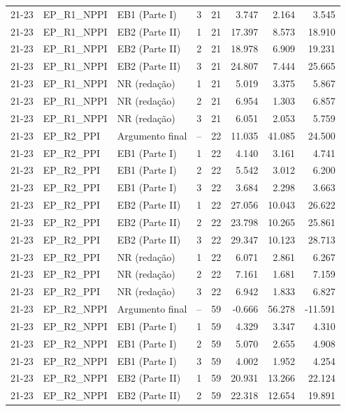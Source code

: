 \begin{longtable}{lllcrrrr}
21-23 & EP\_R1\_NPPI & EB1 (Parte I) & 3 & 21 & 3.747 & 2.164 & 3.545 \\
21-23 & EP\_R1\_NPPI & EB2 (Parte II) & 1 & 21 & 17.397 & 8.573 & 18.910 \\
21-23 & EP\_R1\_NPPI & EB2 (Parte II) & 2 & 21 & 18.978 & 6.909 & 19.231 \\
21-23 & EP\_R1\_NPPI & EB2 (Parte II) & 3 & 21 & 24.807 & 7.444 & 25.665 \\
21-23 & EP\_R1\_NPPI & NR (redação) & 1 & 21 & 5.019 & 3.375 & 5.867 \\
21-23 & EP\_R1\_NPPI & NR (redação) & 2 & 21 & 6.954 & 1.303 & 6.857 \\
21-23 & EP\_R1\_NPPI & NR (redação) & 3 & 21 & 6.051 & 2.053 & 5.759 \\
21-23 & EP\_R2\_PPI & Argumento final & -- & 22 & 11.035 & 41.085 & 24.500 \\
21-23 & EP\_R2\_PPI & EB1 (Parte I) & 1 & 22 & 4.140 & 3.161 & 4.741 \\
21-23 & EP\_R2\_PPI & EB1 (Parte I) & 2 & 22 & 5.542 & 3.012 & 6.200 \\
21-23 & EP\_R2\_PPI & EB1 (Parte I) & 3 & 22 & 3.684 & 2.298 & 3.663 \\
21-23 & EP\_R2\_PPI & EB2 (Parte II) & 1 & 22 & 27.056 & 10.043 & 26.622 \\
21-23 & EP\_R2\_PPI & EB2 (Parte II) & 2 & 22 & 23.798 & 10.265 & 25.861 \\
21-23 & EP\_R2\_PPI & EB2 (Parte II) & 3 & 22 & 29.347 & 10.123 & 28.713 \\
21-23 & EP\_R2\_PPI & NR (redação) & 1 & 22 & 6.071 & 2.861 & 6.267 \\
21-23 & EP\_R2\_PPI & NR (redação) & 2 & 22 & 7.161 & 1.681 & 7.159 \\
21-23 & EP\_R2\_PPI & NR (redação) & 3 & 22 & 6.942 & 1.833 & 6.827 \\
21-23 & EP\_R2\_NPPI & Argumento final & -- & 59 & -0.666 & 56.278 & -11.591 \\
21-23 & EP\_R2\_NPPI & EB1 (Parte I) & 1 & 59 & 4.329 & 3.347 & 4.310 \\
21-23 & EP\_R2\_NPPI & EB1 (Parte I) & 2 & 59 & 5.070 & 2.655 & 4.908 \\
21-23 & EP\_R2\_NPPI & EB1 (Parte I) & 3 & 59 & 4.002 & 1.952 & 4.254 \\
21-23 & EP\_R2\_NPPI & EB2 (Parte II) & 1 & 59 & 20.931 & 13.266 & 22.124 \\
21-23 & EP\_R2\_NPPI & EB2 (Parte II) & 2 & 59 & 22.318 & 12.654 & 19.891 \\

\end{longtable}
